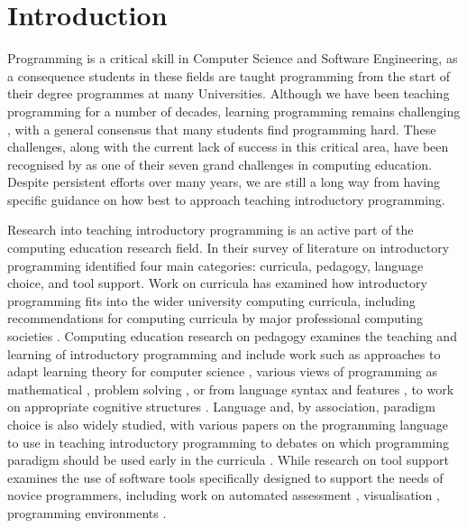 
\chapter{Introduction} %
\label{cha:introduction}


Programming is a critical skill in Computer Science and Software Engineering, as a consequence students in these fields are taught programming from the start of their degree programmes at many Universities. Although we have been teaching programming for a number of decades, learning programming remains challenging \cite{Jenkins:2002,Lahtinen:2005,Lister:2004,McCracken:2001,Ragonis:2007,Robins:2003,Rountree:2002,Renumol:2010,Wiedenbeck:2005}, with a general consensus that many students find programming hard. These challenges, along with the current lack of success in this critical area, have been recognised by \citet{McGettrick:2005} as one of their seven grand challenges in computing education. Despite persistent efforts over many years, we are still a long way from having specific guidance on how best to approach teaching introductory programming. 

Research into teaching introductory programming is an active part of the computing education research field. In their survey of literature on introductory programming \citet{Pears:2007} identified four main categories: curricula, pedagogy, language choice, and tool support. Work on curricula has examined how introductory programming fits into the wider university computing curricula, including recommendations for computing curricula by major professional computing societies \cite{CC2001,CC2008,CSC2013}. Computing education research on pedagogy examines the teaching and learning of introductory programming and include work such as approaches to adapt learning theory for computer science \cite{BenAri:2001}, various views of programming as mathematical \cite{Denning:1989,Dijkstra:1989,Hoare:1969}, problem solving \cite{Palumbo:1990}, or from language syntax and features \cite{Robins:2003}, to work on appropriate cognitive structures \cite{Eckerdal:2005,Green:1996,Green:2000,Soloway:1986}. Language and, by association, paradigm choice is also widely studied, with various papers on the programming language to use in teaching introductory programming \cite{Anik:2011,Boszormenyi:1998,Bishop:2006,Brilliant:1996,Howell:2003,Kelleher:2005,Koffman:1988,Maloney:2010,Mannila:2006,Mannila:2006a,Mody:1991,Pendergast:2006,Roberts:1993} to debates on which programming paradigm should be used early in the curricula \cite{Astrachan:2005,Bennedsen:2004,Cooper:2003,Ehlert:2009,Howe:2004,Lister:2006a,Pattis:1993,Reges:2006}. While research on tool support examines the use of software tools specifically designed to support the needs of novice programmers, including work on automated assessment \cite{AlaMutk:2007,Douce:2005}, visualisation \cite{Naps:2002}, programming environments \cite{Gross:2005,Kelleher:2005,Kolling:2003}.

